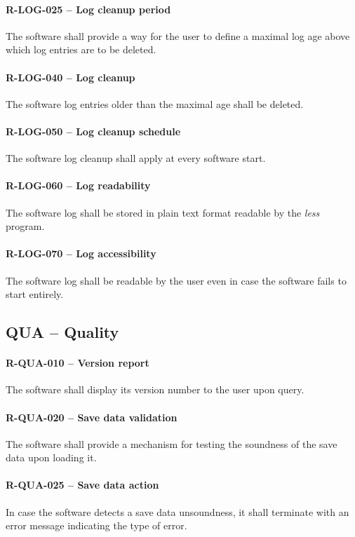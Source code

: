 \paragraph{R-LOG-025 -- Log cleanup period}
The software shall provide a way for the user to define a
maximal log age above which log entries are to be deleted.

\paragraph{R-LOG-040 -- Log cleanup}
The software log entries older than the maximal age shall be deleted.

\paragraph{R-LOG-050 -- Log cleanup schedule}
The software log cleanup shall apply at every software start.

\paragraph{R-LOG-060 -- Log readability}
The software log shall be stored in plain text format readable
by the \emph{less} program.

\paragraph{R-LOG-070 -- Log accessibility}
The software log shall be readable by the user even in case the software
fails to start entirely.

\subsection{QUA -- Quality}
\paragraph{R-QUA-010 -- Version report}
The software shall display its version number to the user upon query.

\paragraph{R-QUA-020 -- Save data validation}
The software shall provide a mechanism for testing the soundness of the
save data upon loading it.

\paragraph{R-QUA-025 -- Save data action}
In case the software detects a save data unsoundness, it shall terminate
with an error message indicating the type of error.

